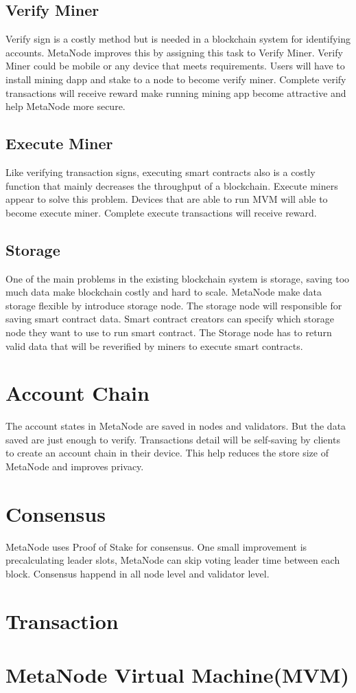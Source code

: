 \documentclass [10pt, fancyhdr, twoside] {article}
\begin{document}
\subsection{Verify Miner}
Verify sign is a costly method but is needed in a blockchain system for identifying accounts. MetaNode improves this by assigning this task to Verify Miner. Verify Miner could be mobile or any device that meets requirements.
Users will have to install mining dapp and stake to a node to become verify miner. Complete verify transactions will receive reward make running mining app become attractive and help MetaNode more secure.
\subsection{Execute Miner}
Like verifying transaction signs, executing smart contracts also is a costly function that mainly decreases the throughput of a blockchain.
Execute miners appear to solve this problem. Devices that are able to run MVM will able to become execute miner. Complete execute transactions will receive reward.
\subsection{Storage}
One of the main problems in the existing blockchain system is storage, saving too much data make blockchain costly and hard to scale. MetaNode make data storage flexible by introduce storage node.
The storage node will responsible for saving smart contract data. Smart contract creators can specify which storage node they want to use to run smart contract.
The Storage node has to return valid data that will be reverified by miners to execute smart contracts.

\section{Account Chain}
The account states in MetaNode are saved in nodes and validators. But the data saved are just enough to verify. Transactions detail will be self-saving by clients to create an account chain in their device.
This help reduces the store size of MetaNode and improves privacy.
\section{Consensus}
MetaNode uses Proof of Stake for consensus. One small improvement is precalculating leader slots, MetaNode can skip voting leader time between each block.
Consensus happend in all node level and validator level. 
\section{Transaction}
\section{MetaNode Virtual Machine(MVM)}
\end{document}
